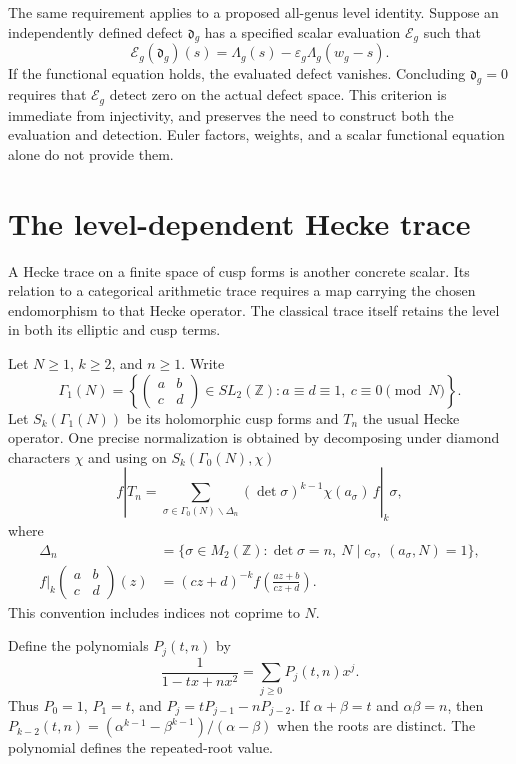 The same requirement applies to a proposed all-genus level identity. Suppose
an independently defined defect $\mathfrak d_g$ has a specified scalar
evaluation $\mathcal E_g$ such that
\[
 \mathcal E_g(\mathfrak d_g)(s)
   =\Lambda_g(s)
       -\varepsilon_g\Lambda_g(w_g-s).
\]
If the functional equation holds, the evaluated defect vanishes. Concluding
$\mathfrak d_g=0$ requires that $\mathcal E_g$ detect zero on the actual
defect space. This criterion is immediate from injectivity, and preserves
the need to construct both the evaluation and detection. Euler factors,
weights, and a scalar functional equation alone do not provide them.

\section{The level-dependent Hecke trace}

A Hecke trace on a finite space of cusp forms is another concrete scalar.
Its relation to a categorical arithmetic trace requires a map carrying the
chosen endomorphism to that Hecke operator. The classical trace itself
retains the level in both its elliptic and cusp terms.

Let $N\geq1$, $k\geq2$, and $n\geq1$. Write
\[
 \Gamma_1(N)=
 \left\{\begin{pmatrix}a&b\\c&d\end{pmatrix}
  \in SL_2(\mathbb Z):
     a\equiv d\equiv1,\ c\equiv0\pmod N\right\}.
\]
Let $S_k(\Gamma_1(N))$ be its holomorphic cusp forms and $T_n$ the usual
Hecke operator. One precise normalization is obtained by decomposing under
diamond characters $\chi$ and using on $S_k(\Gamma_0(N),\chi)$
\[
 f|T_n=
  \sum_{\sigma\in\Gamma_0(N)\backslash\Delta_n}
    (\det\sigma)^{k-1}\chi(a_\sigma)\,f|_k\sigma,
\]
where
\begin{align*}
 \Delta_n&=
 \{\sigma\in M_2(\mathbb Z):
       \det\sigma=n,\ N\mid c_\sigma,\ (a_\sigma,N)=1\},\\
 f|_k\begin{pmatrix}a&b\\c&d\end{pmatrix}(z)
       &=(cz+d)^{-k}f\left(\frac{az+b}{cz+d}\right).
\end{align*}
This convention includes indices not coprime to $N$.

Define the polynomials $P_j(t,n)$ by
\[
 \frac1{1-tx+nx^2}
      =\sum_{j\geq0}P_j(t,n)x^j.
\]
Thus $P_0=1$, $P_1=t$, and $P_j=tP_{j-1}-nP_{j-2}$. If $\alpha+\beta=t$ and
$\alpha\beta=n$, then $P_{k-2}(t,n)=
(\alpha^{k-1}-\beta^{k-1})/(\alpha-\beta)$ when the roots are distinct. The
polynomial defines the repeated-root value.

